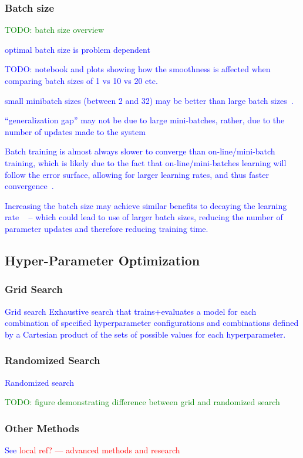 \subsubsection{Batch size}

\textcolor{green}{TODO: batch size overview}

\textcolor{blue}{optimal batch size is problem dependent}

\textcolor{blue}{TODO: notebook and plots showing how the smoothness is affected when comparing batch sizes of 1 vs 10 vs 20 etc.}


\textcolor{blue}{small minibatch sizes (between 2 and 32) may be better than large batch sizes~\cite{masters2018revisiting}.}

\textcolor{blue}{``generalization gap'' may not be due to large mini-batches, rather, due to the number of updates made to the system~\cite{hoffer2017train}}

\textcolor{blue}{Batch training is almost always slower to converge than on-line/mini-batch training, which is likely due to the fact that on-line/mini-batches learning will follow the error surface, allowing for larger learning rates, and thus faster convergence~\cite{wilson2003general}.}

\textcolor{blue}{Increasing the batch size may achieve similar benefits to decaying the learning rate ~\cite{smith2017don} -- which could lead to use of larger batch sizes, reducing the number of parameter updates and therefore reducing training time.}

\subsection{Hyper-Parameter Optimization}

\subsubsection{Grid Search}

\textcolor{blue}{{Grid search} Exhaustive search that trains+evaluates a model for each combination of specified hyperparameter configurations and combinations defined by a Cartesian product of the sets of possible values for each hyperparameter.}

\subsubsection{Randomized Search}

\textcolor{blue}{{Randomized search} }

\textcolor{green}{TODO: figure demonstrating difference between grid and randomized search}

\subsubsection{Other Methods}

\textcolor{blue}{See \textcolor{red}{local ref? --- advanced methods and research}}